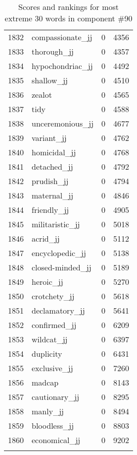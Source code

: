 \begin{longtable}[!htbp]{| rlr@{.}l |}
    1832 & compassionate\_jj & 0 & 4356 \\
    1833 & thorough\_jj & 0 & 4357 \\
    1834 & hypochondriac\_jj & 0 & 4492 \\
    1835 & shallow\_jj & 0 & 4510 \\
    1836 & zealot & 0 & 4565 \\
    1837 & tidy & 0 & 4588 \\
    1838 & unceremonious\_jj & 0 & 4677 \\
    1839 & variant\_jj & 0 & 4762 \\
    1840 & homicidal\_jj & 0 & 4768 \\
    1841 & detached\_jj & 0 & 4792 \\
    1842 & prudish\_jj & 0 & 4794 \\
    1843 & maternal\_jj & 0 & 4846 \\
    1844 & friendly\_jj & 0 & 4905 \\
    1845 & militaristic\_jj & 0 & 5018 \\
    1846 & acrid\_jj & 0 & 5112 \\
    1847 & encyclopedic\_jj & 0 & 5138 \\
    1848 & closed-minded\_jj & 0 & 5189 \\
    1849 & heroic\_jj & 0 & 5270 \\
    1850 & crotchety\_jj & 0 & 5618 \\
    1851 & declamatory\_jj & 0 & 5641 \\
    1852 & confirmed\_jj & 0 & 6209 \\
    1853 & wildcat\_jj & 0 & 6397 \\
    1854 & duplicity & 0 & 6431 \\
    1855 & exclusive\_jj & 0 & 7260 \\
    1856 & madcap & 0 & 8143 \\
    1857 & cautionary\_jj & 0 & 8295 \\
    1858 & manly\_jj & 0 & 8494 \\
    1859 & bloodless\_jj & 0 & 8803 \\
    1860 & economical\_jj & 0 & 9202 \\
    \hline
    \caption{Scores and rankings for most extreme 30 words in component \#90} \\
\end{longtable}
